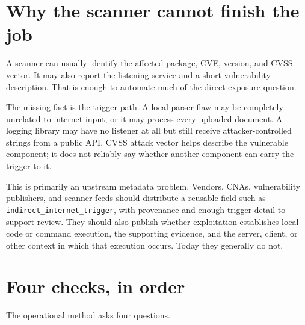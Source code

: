 \documentclass[11pt]{article}
\newcommand{\code}[1]{\texttt{#1}}
\begin{document}
\section*{Why the scanner cannot finish the job}
A scanner can usually identify the affected package, CVE, version, and CVSS
vector. It may also report the listening service and a short vulnerability
description. That is enough to automate much of the direct-exposure question.

The missing fact is the trigger path. A local parser flaw may be completely
unrelated to internet input, or it may process every uploaded document. A
logging library may have no listener at all but still receive attacker-controlled
strings from a public API. CVSS attack vector helps describe the vulnerable
component; it does not reliably say whether another component can carry the
trigger to it.

This is primarily an upstream metadata problem. Vendors, CNAs, vulnerability
publishers, and scanner feeds should distribute a reusable field such as
\code{indirect\_internet\_trigger}, with provenance and enough trigger detail to
support review. They should also publish whether exploitation establishes local
code or command execution, the supporting evidence, and the server, client, or
other context in which that execution occurs. Today they generally do not.

\section*{Four checks, in order}
The operational method asks four questions.
\end{document}
